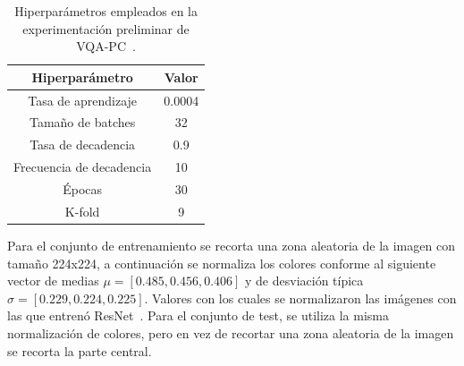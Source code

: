 \begin{table}[htp]
  \scriptsize
  \begin{center}
    \begin{tabular}[c]{|c|c|}
      \hline
      \rowcolor[HTML]{FFC702}
      \textbf{Hiperparámetro} & \textbf{Valor} \\ 
      \hline 
      Tasa de aprendizaje &  0.0004 \\ 
      \hline 
      Tamaño de batches & 32 \\ 
      \hline 
      Tasa de decadencia & 0.9 \\ 
      \hline 
      Frecuencia de decadencia & 10 \\ 
      \hline 
      Épocas & 30 \\ 
      \hline 
      K-fold & 9 \\ 
      \hline 
    \end{tabular}
  \end{center}
  \caption[Hiperparámetros empleados en la experimentación preliminar de VQA-PC.]{
    Hiperparámetros empleados en la experimentación preliminar de VQA-PC~\cite{VQA-PC}.
  }
  \label{tab:HiperSJTU}
\end{table}

Para el conjunto de entrenamiento se recorta una zona aleatoria de la imagen con 
tamaño 224x224, a continuación se normaliza los colores conforme al siguiente 
vector de medias $\mu = \left[ 0.485, 0.456, 0.406 \right]$ y de desviación típica
$\sigma = \left[ 0.229, 0.224, 0.225 \right]$. Valores con los cuales se 
normalizaron las imágenes con las que entrenó ResNet~\cite{ResNet}.
Para el conjunto de test, se utiliza la misma normalización de colores, pero 
en vez de recortar una zona aleatoria de la imagen se recorta la parte central. 

